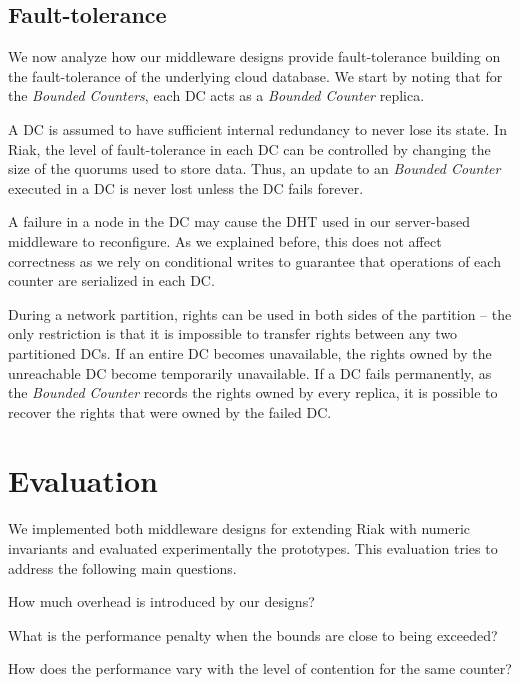 \documentclass[conference]{IEEEtran}
\newcommand{\InvCounter}{\emph{Bounded Counter}}
\newcommand{\InvCounters}{\emph{Bounded Counters}}
\begin{document}
\subsection{Fault-tolerance}

We now analyze how our middleware designs provide fault-tolerance
building on the fault-tolerance of the underlying cloud
database. 
We start by noting that for the \InvCounters{}, each DC acts as a 
\InvCounter{} replica.

A DC is assumed to have sufficient internal redundancy to never lose its state.
In Riak, the level of fault-tolerance in each DC can be controlled by 
changing the size of the quorums used to store data.
Thus, an update to an \InvCounter{} executed in a DC is never lost 
unless the DC fails forever.

A failure in a node in the DC may cause the DHT used in our server-based
middleware to reconfigure. As we explained before, this does not affect
correctness as we rely on conditional writes to guarantee that operations
of each counter are serialized in each DC.

During a network partition, rights can be used in both sides of the partition -- the
only restriction is that it is impossible to transfer rights between
any two partitioned DCs.
If an entire DC becomes unavailable,
the rights owned by the unreachable DC become temporarily
unavailable.
If a DC fails permanently, as the \InvCounter{} records the rights owned 
by every replica, it is possible to recover the rights that were 
owned by the failed DC.



\section{Evaluation}\label{sec:eval}

We implemented both middleware designs for extending Riak with numeric invariants and evaluated experimentally the prototypes.
This evaluation tries to address the following main questions.
\begin{inparaenum}[(i)]
\item How much overhead is introduced by our designs?
\item What is the performance penalty when the bounds are close
to being exceeded? 
\item How does the performance vary with the level of contention for
the same counter?
\end{inparaenum}
\end{document}
